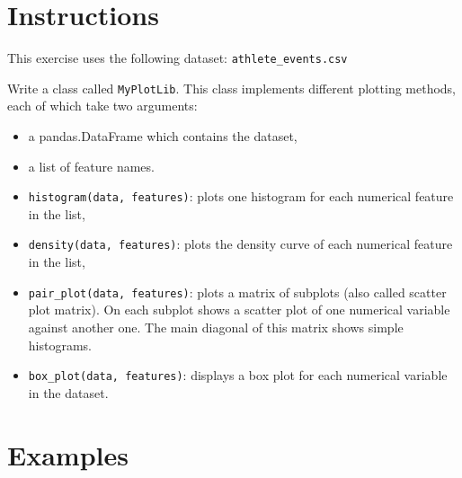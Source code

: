 \documentclass{42-en}
\begin{document}
\section*{Instructions}
This exercise uses the following dataset: \texttt{athlete\_events.csv}

Write a class called \texttt{MyPlotLib}. This class implements different plotting
methods, each of which take two arguments:
\begin{itemize}
  \item a pandas.DataFrame which contains the dataset,
  \item a list of feature names.
\end{itemize}


\begin{itemize}
  \item \texttt{histogram(data, features)}: plots one histogram for each numerical feature in the list,
  \item \texttt{density(data, features)}: plots the density curve of each numerical feature in the list,
  \item \texttt{pair\_plot(data, features)}: plots a matrix of subplots (also called scatter plot matrix).
        On each subplot shows a scatter plot of one numerical variable against another one.
        The main diagonal of this matrix shows simple histograms.
  \item \texttt{box\_plot(data, features)}: displays a box plot for each numerical variable in the dataset.
\end{itemize}

\section*{Examples}
\end{document}
